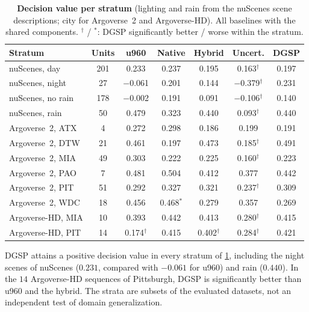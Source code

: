 \documentclass[10pt,letterpaper]{article}
\newcommand{\method}{DGSP\xspace}
\theoremstyle{remark}
\theoremstyle{plain}
\theoremstyle{definition}
\begin{document}
\begin{table}[!tbp]
\centering
\caption{\textbf{Decision value per stratum} (lighting and rain from the nuScenes scene descriptions; city for Argoverse~2 and Argoverse-HD). All baselines with the shared components. $^{\dagger}$ / $^{\ast}$: \method significantly better / worse within the stratum.}
\label{tab:strata}
\footnotesize
\setlength{\tabcolsep}{2.2pt}
\begin{tabular}{@{}lcccccc@{}}
\toprule
Stratum & Units & u960 & Native & Hybrid & Uncert. & \method \\
\midrule
nuScenes, day & 201 & 0.233 & 0.237 & 0.195 & 0.163$^{\dagger}$ & 0.197 \\
nuScenes, night & 27 & $-$0.061 & 0.201 & 0.144 & $-$0.379$^{\dagger}$ & 0.231 \\
nuScenes, no rain & 178 & $-$0.002 & 0.191 & 0.091 & $-$0.106$^{\dagger}$ & 0.140 \\
nuScenes, rain & 50 & 0.479 & 0.323 & 0.440 & 0.093$^{\dagger}$ & 0.440 \\
\midrule
Argoverse~2, ATX & 4 & 0.272 & 0.298 & 0.186 & 0.199 & 0.191 \\
Argoverse~2, DTW & 21 & 0.461 & 0.197 & 0.473 & 0.185$^{\dagger}$ & 0.491 \\
Argoverse~2, MIA & 49 & 0.303 & 0.222 & 0.225 & 0.160$^{\dagger}$ & 0.223 \\
Argoverse~2, PAO & 7 & 0.481 & 0.504 & 0.412 & 0.377 & 0.442 \\
Argoverse~2, PIT & 51 & 0.292 & 0.327 & 0.321 & 0.237$^{\dagger}$ & 0.309 \\
Argoverse~2, WDC & 18 & 0.456 & 0.468$^{\ast}$ & 0.279 & 0.357 & 0.269 \\
\midrule
Argoverse-HD, MIA & 10 & 0.393 & 0.442 & 0.413 & 0.280$^{\dagger}$ & 0.415 \\
Argoverse-HD, PIT & 14 & 0.174$^{\dagger}$ & 0.415 & 0.402$^{\dagger}$ & 0.284$^{\dagger}$ & 0.421 \\
\bottomrule
\end{tabular}
\end{table}

\method attains a positive decision value in every stratum of \cref{tab:strata}, including the night scenes of nuScenes ($0.231$, compared with $-0.061$ for u960) and rain ($0.440$).
In the $14$ Argoverse-HD sequences of Pittsburgh, \method is significantly better than u960 and the hybrid.
The strata are subsets of the evaluated datasets, not an independent test of domain generalization.
\end{document}
